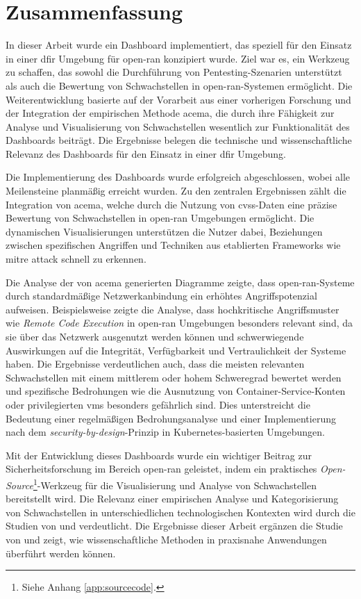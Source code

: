 \chapter{Zusammenfassung}
\label{chap:zusammenfassung}
In dieser Arbeit wurde ein Dashboard implementiert, das speziell für den Einsatz in einer \gls{dfir} Umgebung für \gls{open-ran} konzipiert wurde. Ziel war es, ein Werkzeug zu schaffen, das sowohl die Durchführung von Pentesting-Szenarien unterstützt als auch die Bewertung von Schwachstellen in \gls{open-ran}-Systemen ermöglicht. Die Weiterentwicklung basierte auf der Vorarbeit aus einer vorherigen Forschung und der Integration der empirischen Methode \gls{acema}, die durch ihre Fähigkeit zur Analyse und Visualisierung von Schwachstellen wesentlich zur Funktionalität des Dashboards beiträgt. Die Ergebnisse belegen die technische und wissenschaftliche Relevanz des Dashboards für den Einsatz in einer \gls{dfir} Umgebung.

Die Implementierung des Dashboards wurde erfolgreich abgeschlossen, wobei alle Meilensteine planmäßig erreicht wurden. Zu den zentralen Ergebnissen zählt die Integration von \gls{acema}, welche durch die Nutzung von \gls{cvss}-Daten eine präzise Bewertung von Schwachstellen in \gls{open-ran} Umgebungen ermöglicht. Die dynamischen Visualisierungen unterstützen die Nutzer dabei, Beziehungen zwischen spezifischen Angriffen und Techniken aus etablierten Frameworks wie \gls{mitre} \gls{attack} schnell zu erkennen.

Die Analyse der von \gls{acema} generierten Diagramme zeigte, dass \gls{open-ran}-Systeme durch standardmäßige Netzwerkanbindung ein erhöhtes Angriffspotenzial aufweisen. Beispielsweise zeigte die Analyse, dass hochkritische Angriffsmuster wie \textit{Remote Code Execution} in \gls{open-ran} Umgebungen besonders relevant sind, da sie über das Netzwerk ausgenutzt werden können und schwerwiegende Auswirkungen auf die Integrität, Verfügbarkeit und Vertraulichkeit der Systeme haben. Die Ergebnisse verdeutlichen auch, dass die meisten relevanten Schwachstellen mit einem mittlerem oder hohem Schweregrad bewertet werden und spezifische Bedrohungen wie die Ausnutzung von Container-Service-Konten oder privilegierten \glspl{vm} besonders gefährlich sind. Dies unterstreicht die Bedeutung einer regelmäßigen Bedrohungsanalyse und einer Implementierung nach dem \textit{security-by-design}-Prinzip in Kubernetes-basierten Umgebungen.

Mit der Entwicklung dieses Dashboards wurde ein wichtiger Beitrag zur Sicherheitsforschung im Bereich \gls{open-ran} geleistet, indem ein praktisches \textit{Open-Source}\footnote{Siehe Anhang \ref{app:sourcecode}.}-Werkzeug für die Visualisierung und Analyse von Schwachstellen bereitstellt wird. Die Relevanz einer empirischen Analyse und Kategorisierung von Schwachstellen in unterschiedlichen technologischen Kontexten wird durch die Studien von \autocite{mazuera-rozoAndroidOSStack2019} und \autocite{klementSecuring6GTransition2024} verdeutlicht. Die Ergebnisse dieser Arbeit ergänzen die Studie von \citeauthor{klementSecuring6GTransition2024} und zeigt, wie wissenschaftliche Methoden in praxisnahe Anwendungen überführt werden können.

